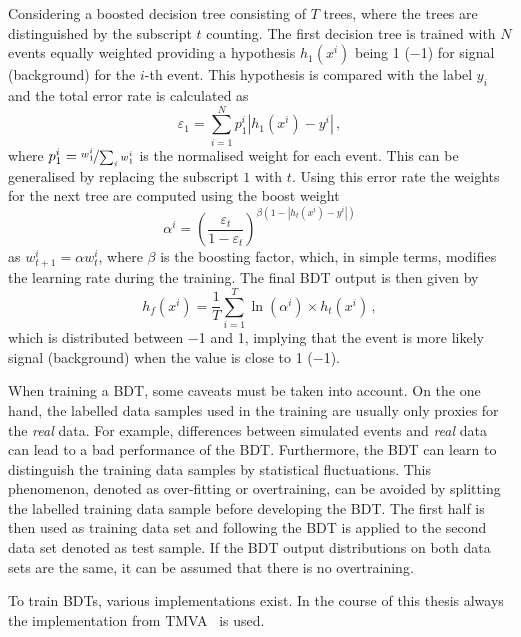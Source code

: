 Considering a boosted decision tree consisting of $T$ trees, where the trees are distinguished by the subscript $t$ counting.
The first decision tree is trained with $N$ events equally weighted providing a hypothesis $h_1(x^i)$ being \num{+1} (\num{-1}) for signal (background) for the $i$-th event.
This hypothesis is compared with the label $y_i$ and the total error rate is calculated as
\begin{equation}
\varepsilon_1=\sum_{i=1}^{N}p^i_1\left|h_1(x^i)-y^i\right|\,,
\end{equation}
where $p_1^i=\nicefrac{w_1^i}{\sum_{i}w_1^i}$ is the normalised weight for each event.
This can be generalised by replacing the subscript $1$ with $t$.
Using this error rate the weights for the next tree are computed using the boost weight
\begin{equation}
\alpha^i=\left(\frac{\varepsilon_t}{1-\varepsilon_t}\right)^{\beta\left(1-\left|h_t(x^i)-y^i\right|\right)}
\end{equation}
as $w_{t+1}^i=\alpha w_t^i$, where $\beta$ is the boosting factor,  which, in simple terms, modifies the learning rate during the training.
The final BDT output is then given by
\begin{equation}
h_f(x^i)=\frac{1}{T}\sum_{i=1}^{T}\ln\left(\alpha^i\right)\times h_t(x^i)\,,
\end{equation}
which is distributed between \num{-1} and \num{+1}, implying that the event is more likely signal (background) when the value is close to \num{+1} (\num{-1}).

When training a \ac{BDT}, some caveats must be taken into account.
On the one hand, the labelled data samples used in the training are usually only proxies for the \emph{real} data.
For example, differences between simulated events and \emph{real} data can lead to a bad performance of the \ac{BDT}.
Furthermore, the \ac{BDT} can learn to distinguish the training data samples by statistical fluctuations.
This phenomenon, denoted as over-fitting or overtraining, can be avoided by splitting the labelled training data sample before developing the \ac{BDT}.
The first half is then used as training data set and following the \ac{BDT} is applied to the second data set denoted as test sample.
If the \ac{BDT} output distributions on both data sets are the same, it can be assumed that there is no overtraining.

To train \ac{BDT}s, various implementations exist.
In the course of this thesis always the implementation from TMVA~\cite{Hocker:2007ht} is used.


